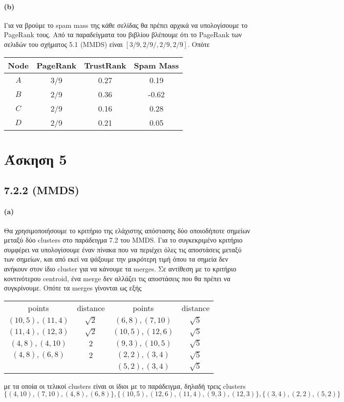 \documentclass[a4paper,11pt]{article}
\begin{document}
\paragraph{(b)} Για να βρούμε το spam mass της κάθε σελίδας θα πρέπει αρχικά να υπολογίσουμε το PageRank τους.
Από τα παραδείγματα του βιβλίου βλέπουμε ότι το PageRank των σελιδών του σχήματος 5.1 (MMDS) είναι $[3/9,2/9/,2/9,2/9]$.
Οπότε
\begin{center}
	\begin{tabular}{c c c c}
		Node & PageRank & TrustRank & Spam Mass \\
		\hline
		$A$ & 3/9 & 0.27 & 0.19 \\
		$B$ & 2/9 & 0.36 & -0.62 \\
		$C$ & 2/9 & 0.16 & 0.28 \\
		$D$ & 2/9 & 0.21 & 0.05
	\end{tabular}
\end{center}

\section*{Άσκηση 5}

\subsection*{7.2.2 (MMDS)}

\paragraph{(a)} Θα χρησιμοποιήσουμε το κριτήριο της ελάχιστης απόστασης δύο οποιοδήποτε σημείων μεταξύ δύο clusters στο παράδειγμα 7.2 του MMDS.
Για το συγκεκριμένο κριτήριο συμφέρει να υπολογίσουμε έναν πίνακα που να περιέχει όλες τις αποστάσεις μεταξύ των σημείων, και από εκεί να ψάξουμε την μικρότερη τιμή όπου τα σημεία δεν ανήκουν στον ίδιο cluster για να κάνουμε τα merges.
Σε αντίθεση με το κριτήριο κοντινότερου centroid, ένα merge δεν αλλάζει τις αποστάσεις που θα πρέπει να συγκρίνουμε.
Οπότε τα merges γίνονται ως εξής
\begin{center}
	\begin{tabular}{| c | c || c | c |}
		\hline
		points & distance & points & distance \\ \hhline{|=|=#=|=|}
		$(10,5),(11,4)$ & $\sqrt{2}$ & $(6,8),(7,10)$ & $\sqrt{5}$ \\ \hline
		$(11,4),(12,3)$ & $\sqrt{2}$ & $(10,5),(12,6)$ & $\sqrt{5}$ \\ \hline
		$(4,8),(4,10)$ & $2$ & $(9,3),(10,5)$ & $\sqrt{5}$\\ \hline
		$(4,8),(6,8)$ & $2$ & $(2,2),(3,4)$ & $\sqrt{5}$ \\ \hline
		& & $(5,2),(3,4)$ & $\sqrt{5}$ \\ \hline
	\end{tabular}
\end{center}
με τα οποία οι τελικοί clusters είναι οι ίδιοι με το παράδειγμα, δηλαδή τρεις clusters
\[ \{ (4,10),(7,10),(4,8),(6,8) \}, \{ (10,5),(12,6),(11,4),(9,3),(12,3) \}, \{ (3,4),(2,2),(5,2) \} \]
\end{document}
